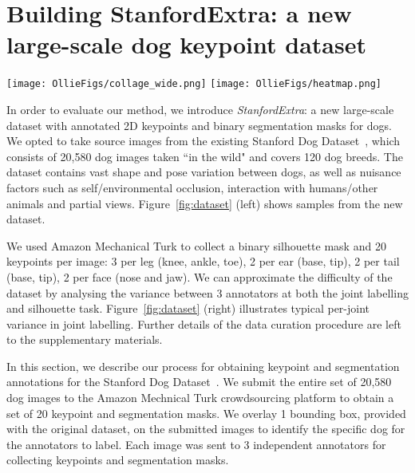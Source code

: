 
\section{Building StanfordExtra: a new large-scale dog keypoint dataset}

\begin{figure*}[h]
    \centering
    \texttt{[image: OllieFigs/collage\_wide.png]}
    \texttt{[image: OllieFigs/heatmap.png]}
    \caption{\textbf{StanfordExtra example images}. \emph{Left}: outlined segmentations and labelled keypoints for 24 representative images. \emph{Right}: heatmap of deviation of worker submitted results from mean for each submission.}
    \label{fig:dataset}
\end{figure*}

In order to evaluate our method, we introduce \emph{StanfordExtra}: a new large-scale dataset with annotated 2D keypoints and binary segmentation masks for dogs. We opted to take source images from the existing Stanford Dog Dataset~\cite{StanfordDogs}, which consists of 20,580 dog images taken ``in the wild" and covers 120 dog breeds. The dataset contains vast shape and pose variation between dogs, as well as nuisance factors such as self/environmental occlusion, interaction with humans/other animals and partial views. Figure~\ref{fig:dataset} (left) shows samples from the new dataset.

We used Amazon Mechanical Turk to collect a binary silhouette mask and 20 keypoints per image: 3 per leg (knee, ankle, toe), 2 per ear (base, tip), 2 per tail (base, tip), 2 per face (nose and jaw). We can approximate the difficulty of the dataset by analysing the variance between 3 annotators at both the joint labelling and silhouette task. Figure~\ref{fig:dataset} (right) illustrates typical per-joint variance in joint labelling. Further details of the data curation procedure are left to the supplementary materials. 


In this section, we describe our process for  obtaining keypoint and segmentation annotations for the Stanford Dog Dataset~\cite{StanfordDogs}. We submit the entire set of 20,580 dog images to the Amazon Mechnical Turk crowdsourcing platform to obtain a set of 20 keypoint and segmentation masks. We overlay 1 bounding box, provided with the original dataset, on the submitted images to identify the specific dog for the annotators to label. Each image was sent to 3 independent annotators for collecting keypoints and segmentation masks.

